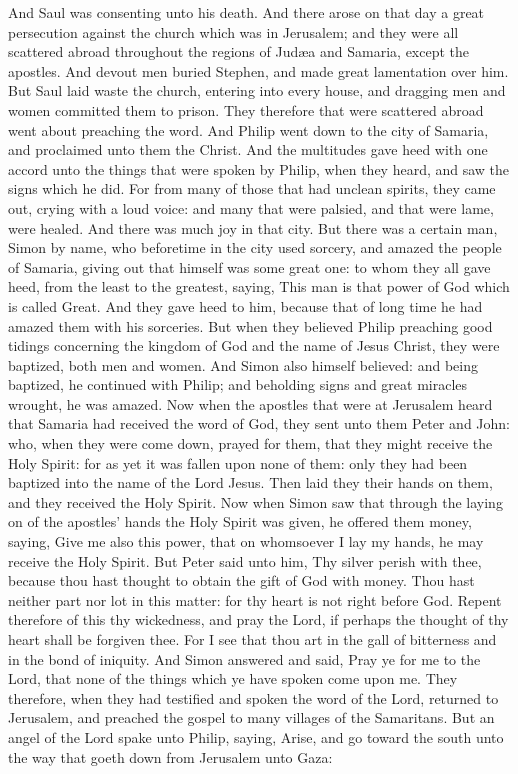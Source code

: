 And Saul was consenting unto his death. And there arose on that day a great persecution against the church which was in Jerusalem; and they were all scattered abroad throughout the regions of Judæa and Samaria, except the apostles. And devout men buried Stephen, and made great lamentation over him. But Saul laid waste the church, entering into every house, and dragging men and women committed them to prison.  They therefore that were scattered abroad went about preaching the word. And Philip went down to the city of Samaria, and proclaimed unto them the Christ. And the multitudes gave heed with one accord unto the things that were spoken by Philip, when they heard, and saw the signs which he did. For from many of those that had unclean spirits, they came out, crying with a loud voice: and many that were palsied, and that were lame, were healed. And there was much joy in that city.  But there was a certain man, Simon by name, who beforetime in the city used sorcery, and amazed the people of Samaria, giving out that himself was some great one: to whom they all gave heed, from the least to the greatest, saying, This man is that power of God which is called Great. And they gave heed to him, because that of long time he had amazed them with his sorceries. But when they believed Philip preaching good tidings concerning the kingdom of God and the name of Jesus Christ, they were baptized, both men and women. And Simon also himself believed: and being baptized, he continued with Philip; and beholding signs and great miracles wrought, he was amazed.  Now when the apostles that were at Jerusalem heard that Samaria had received the word of God, they sent unto them Peter and John: who, when they were come down, prayed for them, that they might receive the Holy Spirit: for as yet it was fallen upon none of them: only they had been baptized into the name of the Lord Jesus. Then laid they their hands on them, and they received the Holy Spirit. Now when Simon saw that through the laying on of the apostles’ hands the Holy Spirit was given, he offered them money, saying, Give me also this power, that on whomsoever I lay my hands, he may receive the Holy Spirit. But Peter said unto him, Thy silver perish with thee, because thou hast thought to obtain the gift of God with money. Thou hast neither part nor lot in this matter: for thy heart is not right before God. Repent therefore of this thy wickedness, and pray the Lord, if perhaps the thought of thy heart shall be forgiven thee. For I see that thou art in the gall of bitterness and in the bond of iniquity. And Simon answered and said, Pray ye for me to the Lord, that none of the things which ye have spoken come upon me.  They therefore, when they had testified and spoken the word of the Lord, returned to Jerusalem, and preached the gospel to many villages of the Samaritans.  But an angel of the Lord spake unto Philip, saying, Arise, and go toward the south unto the way that goeth down from Jerusalem unto Gaza: 
